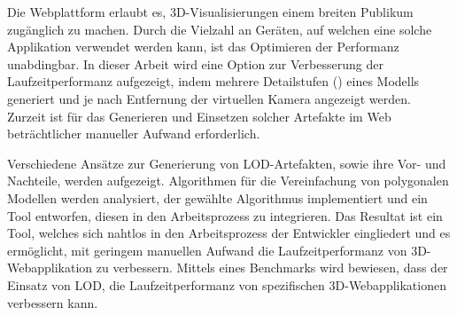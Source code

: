 Die Webplattform erlaubt es, 3D-Visualisierungen einem breiten Publikum zugänglich zu machen. Durch die Vielzahl an Geräten, auf welchen eine solche Applikation verwendet werden kann, ist das Optimieren der Performanz unabdingbar. In dieser Arbeit wird eine Option zur Verbesserung der Laufzeitperformanz aufgezeigt, indem mehrere Detailstufen () eines Modells generiert und je nach Entfernung der virtuellen Kamera angezeigt werden. Zurzeit ist für das Generieren und Einsetzen solcher Artefakte im Web beträchtlicher manueller Aufwand erforderlich.

\bigbreak
Verschiedene Ansätze zur Generierung von LOD-Artefakten, sowie ihre Vor- und Nachteile, werden aufgezeigt.
Algorithmen für die Vereinfachung von polygonalen Modellen werden analysiert, der gewählte Algorithmus implementiert und ein Tool entworfen, diesen in den Arbeitsprozess zu integrieren.
\bigbreak
Das Resultat ist ein Tool, welches sich nahtlos in den Arbeitsprozess der Entwickler eingliedert und es ermöglicht, mit geringem manuellen Aufwand die Laufzeitperformanz von 3D-Webapplikation zu verbessern.
Mittels eines Benchmarks wird bewiesen, dass der Einsatz von LOD, die Laufzeitperformanz von spezifischen 3D-Webapplikationen verbessern kann.
